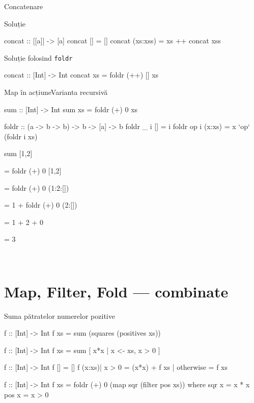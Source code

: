 \documentclass[xcolor=pdftex,romanian,colorlinks]{beamer}
\begin{document}
\begin{frame}[fragile]{Concatenare}
\begin{block}{Soluție }
\begin{asciihs}
concat :: [[a]] -> [a]
concat []       = []
concat (xs:xss) = xs ++ concat xss
\end{asciihs}
\end{block}
\begin{block}{Soluție folosind \lstinline$foldr$}
\begin{asciihs}
concat :: [Int] -> Int
concat xs = foldr (++) [] xs
\end{asciihs}
\end{block}
\end{frame}


\begin{frame}[fragile]{Map în acțiune}{Varianta recursivă}
\begin{asciihs}
sum :: [Int] -> Int
sum xs = foldr (+) 0 xs

foldr :: (a -> b -> b) -> b -> [a] -> b
foldr _ i []      = i
foldr op i (x:xs) = x `op` (foldr i xs)
\end{asciihs}

\vfill
sum [1,2]

\medskip
= foldr (+) 0 [1,2]

\medskip
= foldr (+) 0 (1:2:[])

\medskip
{}
= 1 + foldr (+) 0 (2:[])

\medskip
{}
= 1 + 2 + 0

\medskip
= 3

\medskip

\vfill\
\end{frame}

\section{Map, Filter, Fold --- combinate}

\begin{frame}[fragile]{Suma pătratelor numerelor pozitive}
\begin{asciihs}
f :: [Int] -> Int
f xs = sum (squares (positives xs))

f :: [Int] -> Int
f xs = sum [ x*x | x <- xs, x > 0 ]

f :: [Int] -> Int
f []                = []
f (x:xs)| x > 0     = (x*x) + f xs
        | otherwise = f xs
        
f :: [Int] -> Int
f xs = foldr (+) 0 (map sqr (filter pos xs))
  where
    sqr x = x * x
    pos x = x > 0
\end{asciihs}
\end{frame}
\end{document}
